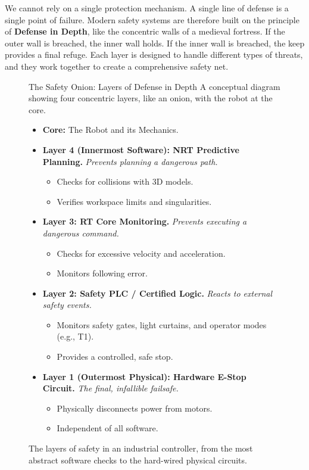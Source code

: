 We cannot rely on a single protection mechanism. A single line of defense is a single point of failure. Modern safety systems are therefore built on the principle of \textbf{Defense in Depth}, like the concentric walls of a medieval fortress. If the outer wall is breached, the inner wall holds. If the inner wall is breached, the keep provides a final refuge. Each layer is designed to handle different types of threats, and they work together to create a comprehensive safety net.

\begin{figure}[h!]
    \centering
    \begin{infobox}{The Safety Onion: Layers of Defense in Depth}
        A conceptual diagram showing four concentric layers, like an onion, with the robot at the core.
        
        \begin{itemize}
            \item \textbf{Core:} The Robot and its Mechanics.
            \item \textbf{Layer 4 (Innermost Software): NRT Predictive Planning.} \textit{Prevents planning a dangerous path.}
            \begin{itemize}
                \item Checks for collisions with 3D models.
                \item Verifies workspace limits and singularities.
            \end{itemize}
            \item \textbf{Layer 3: RT Core Monitoring.} \textit{Prevents executing a dangerous command.}
            \begin{itemize}
                \item Checks for excessive velocity and acceleration.
                \item Monitors following error.
            \end{itemize}
            \item \textbf{Layer 2: Safety PLC / Certified Logic.} \textit{Reacts to external safety events.}
            \begin{itemize}
                \item Monitors safety gates, light curtains, and operator modes (e.g., T1).
                \item Provides a controlled, safe stop.
            \end{itemize}
            \item \textbf{Layer 1 (Outermost Physical): Hardware E-Stop Circuit.} \textit{The final, infallible failsafe.}
            \begin{itemize}
                \item Physically disconnects power from motors.
                \item Independent of all software.
            \end{itemize}
        \end{itemize}
    \end{infobox}
    \caption{The layers of safety in an industrial controller, from the most abstract software checks to the hard-wired physical circuits.}
    \label{fig:safety_onion}
\end{figure}

